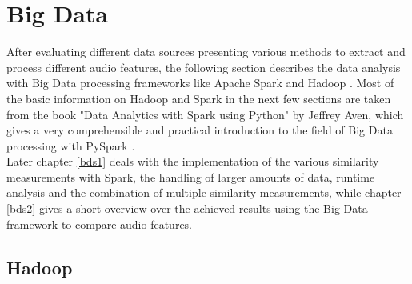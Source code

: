 
\section{Big Data}\label{bdf}

After evaluating different data sources presenting various methods to extract and process different audio features, the following section describes the data analysis with Big Data processing frameworks like Apache Spark \cite{spark} and Hadoop \cite{hadoop}. Most of the basic information on Hadoop and Spark in the next few sections are taken from the book "Data Analytics with Spark using Python" by Jeffrey Aven, which gives a very comprehensible and practical introduction to the field of Big Data processing with PySpark \cite{sparkbook1}.\\ 
Later chapter \ref{bds1} deals with the implementation of the various similarity measurements with Spark, the handling of larger amounts of data, runtime analysis and the combination of multiple similarity measurements, while chapter \ref{bds2} gives a short overview over the achieved results using the Big Data framework to compare audio features. 

\subsection{Hadoop}

